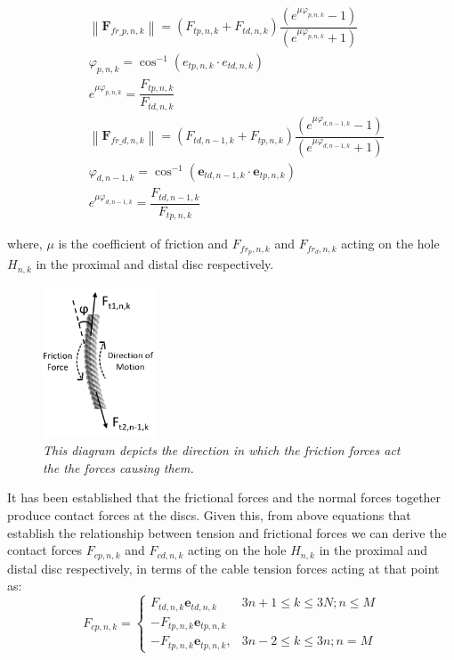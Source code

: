 \documentclass[a4paper,12pt]{report}
\begin{document}
\begin{align}
&\left\|\boldsymbol{F}_{fr\_p, n, k}\right\|= \left(F_{tp, n, k}+F_{td, n, k}\right)\dfrac{\left(e^{\mu \varphi_{p, n, k}}-1\right)}{\left(e^{\mu\varphi_{p, n, k}}+1\right)} \\
&\varphi_{p, n, k}= \cos ^{-1}\left(e_{tp, n, k} \cdot e_{td, n, k}\right)\\
\label{tension-rec-2}
&e^{\mu \varphi_{p, n, k}}= \dfrac{F_{tp, n, k}}{F_{td, n, k}}\\
&\left\|\boldsymbol{F}_{fr\_d, n, k}\right\|= \left(F_{td, n-1, k}+F_{tp, n, k}\right)\dfrac{\left(e^{\mu \varphi_{d, n-1, k}}-1\right)} {\left(e^{\mu \varphi_{d, n-1, k}}+1\right)}\\
&\varphi_{d, n-1, k}= \cos ^{-1}\left(\boldsymbol{e}_{td, n-1, k} \cdot \boldsymbol{e}_{tp, n, k}\right)\\
\label{tension-rec-1}
&e^{\mu \varphi_{d, n-1, k}}= \dfrac{F_{td, n-1, k}}{F_{tp, n, k}}
\end{align} 

where, $ \mu $ is the coefficient of friction and  $ F_{fr_p,n,k} $ and $ F_{fr_d,n,k} $ acting on the hole $ H_{n,k} $ in the proximal and distal disc respectively.

\begin{figure}
	\centering
	\vspace{-30pt}
	\includegraphics[width=0.3\textwidth, angle=0]{images/Cable forces.png}
	\caption{\textit{ This diagram depicts the direction in which the friction forces act the the forces causing them.}}
	\label{friction-fig}
\end{figure}

It has been established that the frictional forces and the normal forces together produce contact forces at the discs. Given this, from above equations that establish the relationship between tension and frictional forces we can derive the contact forces $ F_{c p, n, k} $ and $ F_{c d, n, k} $ acting on the hole $ H_{n,k} $ in the proximal and distal disc respectively, in terms of the cable tension forces acting at that point as: 
\begin{equation}
F_{c p, n, k}=\left\{\begin{array}{cl}
F_{t d, n, k} \boldsymbol{e}_{t d, n, k} & 3 n+1 \leq k \leq 3 N ; n \leq M \\
-F_{t p, n, k} \boldsymbol{e}_{t p, n, k} & \\
-F_{t p, n, k} \boldsymbol{e}_{t p, n, k}, & 3 n-2 \leq k \leq 3 n ; n=M
\end{array}\right.
\end{equation}
\end{document}
